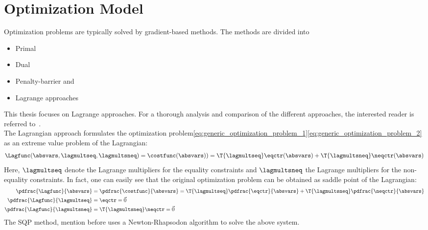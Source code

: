 \documentclass[../main.tex]{subfiles}
\begin{document}
\section{Optimization Model}\label{sec:optimization_model}
Optimization problems are typically solved by gradient-based methods. The methods are divided into
\begin{itemize}
\item Primal
\item Dual
\item Penalty-barrier   and
\item Lagrange approaches
\end{itemize}
This thesis focuses on Lagrange approaches. For a thorough analysis and comparison of the different approaches, the interested reader is referred to~\cite{Schittkowski1994}.\\
The Lagrangian approach formulates the optimization problem\eqref{eq:generic_optimization_problem_1}\eqref{eq:generic_optimization_problem_2} as an extreme value problem of the Lagrangian:
\begin{align}\label{eq:lagrangian_of_optimization}
\Lagfunc(\absvars,\lagmultseq,\lagmultsneq)=\costfunc(\absvars))=\T{\lagmultseq} \eqctr(\absvars) + \T{\lagmultsneq}\neqctr(\absvars)
\end{align}
Here, $\lagmultseq$ denote the Lagrange multipliers for the equality constraints and $\lagmultsneq$ the Lagrange multipliers for the non-equality constraints.
In fact, one can easily see that the original optimization problem can be obtained as saddle point of the Lagrangian:
\begin{align}\label{eq:saddlepoint_optimization}
\pdfrac{\Lagfunc}{\absvars}&=\pdfrac{\costfunc}{\absvars}=\T{\lagmultseq}\pdfrac{\eqctr}{\absvars}+\T{\lagmultsneq}\pdfrac{\neqctr}{\absvars} \nonumber\\
\pdfrac{\Lagfunc}{\lagmultseq}&=\eqctr=\vec{0} \nonumber\\
\pdfrac{\Lagfunc}{\lagmultsneq}&=\T{\lagmultsneq}\neqctr=\vec{0}
\end{align}
The \ac{SQP} method, mention before uses a Newton-Rhapsodon algorithm to solve the above system.



\def\incrabsvars{\Delta \absvars}
\def\incrlagmultsneq{\Delta \lagmultsneq}
\def\incrlagmultseq{\Delta \lagmultseq}

\def\PPLagfuncBYabsvars{\ppdfrac{\Lagfunc}{\absvars}}
\def\PLagfuncBYabsvars{\pdfrac{\Lagfunc}{\absvars}}
\def\PneqctrBYabsvars{\pdfrac{\neqctr}{\absvar}}
\def\PeqctrBYabsvars{\pdfrac{\eqctr}{\absvar}}
\end{document}
